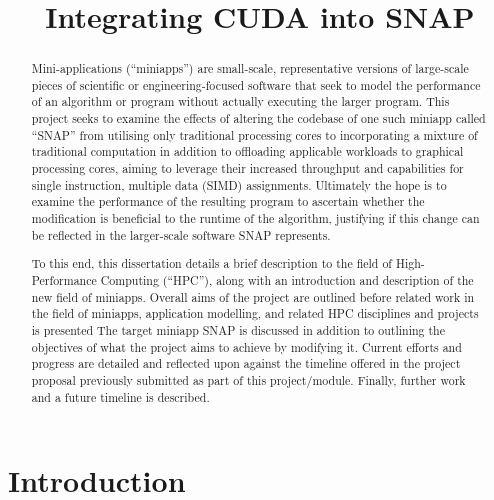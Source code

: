 \documentclass[conference]{IEEEtran}
\begin{document}
\title{Integrating CUDA into SNAP}


\author{
}


\maketitle


\begin{abstract}

Mini-applications (``miniapps'') are small-scale, representative versions of large-scale pieces of scientific or engineering-focused software that seek to model the performance of an algorithm or program without actually executing the larger program. This project seeks to examine the effects of altering the codebase of one such miniapp called ``SNAP'' from utilising only traditional processing cores to incorporating a mixture of traditional computation in addition to offloading applicable workloads to graphical processing cores, aiming to leverage their increased throughput and capabilities for single instruction, multiple data (SIMD) assignments. Ultimately the hope is to examine the performance of the resulting program to ascertain whether the modification is beneficial to the runtime of the algorithm, justifying if this change can be reflected in the larger-scale software SNAP represents.

To this end, this dissertation details a brief description to the field of High-Performance Computing (``HPC''), along with an introduction and description of the new field of miniapps. Overall aims of the project are outlined before related work in the field of miniapps, application modelling, and related HPC disciplines and projects is presented The target miniapp SNAP is discussed in addition to outlining the objectives of what the project aims to achieve by modifying it. Current efforts and progress are detailed and reflected upon against the timeline offered in the project proposal previously submitted as part of this project/module. Finally, further work and a future timeline is described.

\end{abstract}


\section{Introduction}\label{introduction}
\end{document}
